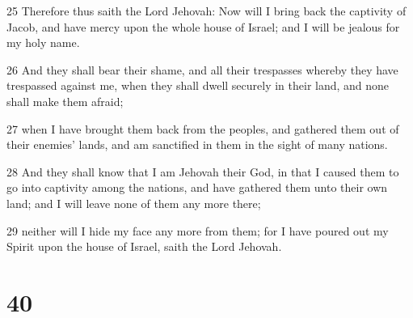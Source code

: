 \par 25 Therefore thus saith the Lord Jehovah: Now will I bring back the captivity of Jacob, and have mercy upon the whole house of Israel; and I will be jealous for my holy name.
\par 26 And they shall bear their shame, and all their trespasses whereby they have trespassed against me, when they shall dwell securely in their land, and none shall make them afraid;
\par 27 when I have brought them back from the peoples, and gathered them out of their enemies' lands, and am sanctified in them in the sight of many nations.
\par 28 And they shall know that I am Jehovah their God, in that I caused them to go into captivity among the nations, and have gathered them unto their own land; and I will leave none of them any more there;
\par 29 neither will I hide my face any more from them; for I have poured out my Spirit upon the house of Israel, saith the Lord Jehovah.

\chapter{40}


